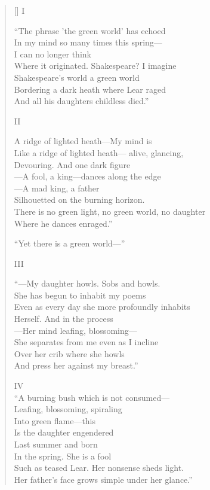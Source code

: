 \label{ch:amotherwatching}
\settowidth{\versewidth}{There is no green light, no green world, no daughter}
\begin{verse}[\versewidth]
I

 ``The phrase 'the green world' has echoed\\
In my mind so many times this spring---\\
I can no longer think\\
Where it originated.  Shakespeare?   I imagine \\
Shakespeare's world a green world\\
Bordering a dark heath where Lear raged\\
And all his daughters childless died.''

II

A ridge of lighted heath---My mind is \\
Like a ridge of lighted heath--- alive, glancing,\\
Devouring. And one dark figure\\
---A fool, a king---dances along the edge\\
---A mad king, a father\\
Silhouetted on the burning horizon.\\
There is no green light, no green world, no daughter\\
Where he dances enraged.''

``Yet there is a green world---''

III

``---My daughter howls. Sobs and howls.\\
She has begun to inhabit my poems\\
Even as every day she more profoundly inhabits\\
Herself. And in the process\\
---Her mind leafing, blossoming---\\
She separates from me even as I incline\\
Over her crib where she howls\\
And press her against my breast.''











IV\\
``A burning bush which  is not consumed---\\
Leafing, blossoming, spiraling\\
Into green flame---this\\
Is the daughter engendered\\
Last summer and born\\
In the spring.   She is a fool\\
Such as teased Lear.   Her nonsense sheds light.\\
Her father's face grows simple under her glance.''


\end{verse}
